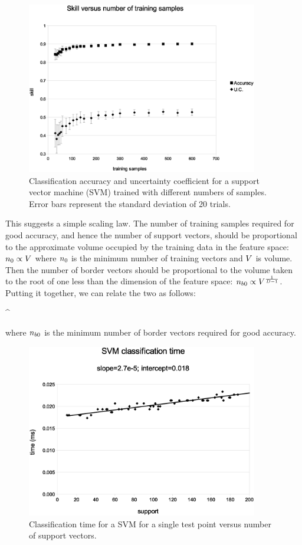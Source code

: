 \begin{figure}
\includegraphics[width=0.9\textwidth]{skill_v_nt}
\caption{Classification accuracy and uncertainty coefficient for a support vector machine (SVM) trained with different numbers of samples.
Error bars represent the standard deviation of 20 trials.}
\label{skill_v_nt}
\end{figure}

This suggests a simple scaling law. The number of training samples required
for good accuracy, and hence the number of support vectors, 
should be proportional to the approximate volume occupied by the
training data in the feature space: $n_0 \propto V$ where 
$n_0$ is the minimum number of training vectors and $V$ is volume.
Then the number of border vectors should be proportional to the volume
taken to the root of one less than the dimension of the feature space:
$n_{b0} \propto V^\frac{1}{D-1}$.
Putting it together, we can relate the two as follows:
\begin{eqnnon}
	\minborders \propto \mintrain^
	\label{scaling_law}
\end{eqnnon}
where $n_{b0}$ is the minimum number of border vectors required for good
accuracy.

\begin{figure}
\includegraphics[width=0.9\textwidth]{svm_time}
\caption{Classification time for a SVM for a single test point versus number of support vectors.}
\label{svm_time}
\end{figure}

